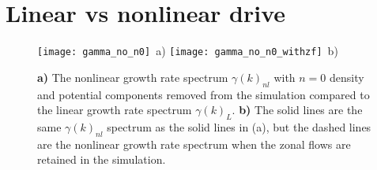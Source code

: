 \documentclass[12pt]{article}
\begin{document}
\section{Linear vs nonlinear drive}


%
%
%

\begin{figure}
\texttt{[image: gamma\_no\_n0]}~a)
\hfil
\texttt{[image: gamma\_no\_n0\_withzf]}~b)
\hfil
\caption{\textbf{a)} The nonlinear growth rate spectrum $\gamma(k)_{nl}$ with $n=0$ density and potential components removed from the 
simulation compared to the linear growth rate spectrum $\gamma(k)_L$.
\textbf{b)} The solid lines are the same $\gamma(k)_{nl}$ spectrum as the solid lines in (a), but the dashed lines are the nonlinear growth rate spectrum when the zonal flows are retained
in the simulation.}
\label{gamma_no_n0_figs}
\end{figure}
\end{document}
